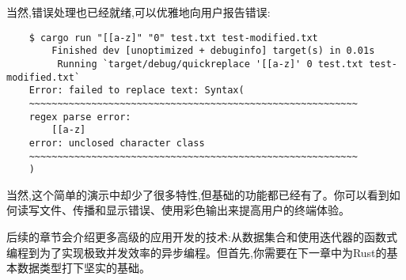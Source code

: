 当然,错误处理也已经就绪,可以优雅地向用户报告错误:
\begin{verbatim}
    $ cargo run "[[a-z]" "0" test.txt test-modified.txt
        Finished dev [unoptimized + debuginfo] target(s) in 0.01s 
         Running `target/debug/quickreplace '[[a-z]' 0 test.txt test-modified.txt`
    Error: failed to replace text: Syntax(
    ~~~~~~~~~~~~~~~~~~~~~~~~~~~~~~~~~~~~~~~~~~~~~~~~~~~~~~~~~~
    regex parse error:
        [[a-z]
    error: unclosed character class
    ~~~~~~~~~~~~~~~~~~~~~~~~~~~~~~~~~~~~~~~~~~~~~~~~~~~~~~~~~~
    )
\end{verbatim}

当然,这个简单的演示中却少了很多特性,但基础的功能都已经有了。你可以看到如何读写文件、传播和显示错误、使用彩色输出来提高用户的终端体验。

后续的章节会介绍更多高级的应用开发的技术:从数据集合和使用迭代器的函数式编程到为了实现极致并发效率的异步编程。但首先,你需要在下一章中为Rust的基本数据类型打下坚实的基础。
